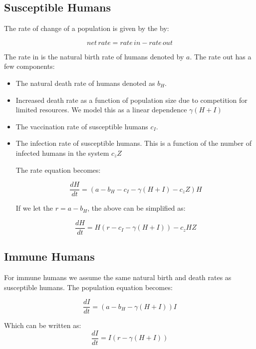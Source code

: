 \documentclass[
	12pt
]{article}
\begin{document}
\subsection{Susceptible Humans}


The rate of change of a population is given by the by:

\begin{equation}
net \, rate = rate \, in - rate \, out
\end{equation}

The rate in is the natural birth rate of humans denoted by $a$. The rate out has a few components:

\begin{itemize}
\item The natural death rate of humans denoted as $b_H$.
\item Increased death rate as a function of population size due to competition for limited resources. We model this as a linear dependence $\gamma(H+I)$
\item The vaccination rate of susceptible humans $c_I$.
\item The infection rate of susceptible humans. This is a function of the number of infected humans in the system $c_zZ$

The rate equation becomes:

\begin{equation}
\frac{dH}{dt} = (a-b_H-c_I-\gamma(H+I)-c_zZ)H
\end{equation}

If we let the $r = a-b_H$, the above can be simplified as:

\begin{equation}
\frac{dH}{dt} = H(r - c_I-\gamma(H+I))-c_zHZ
\end{equation}
\end{itemize}

\subsection{Immune Humans}

For immune humans we assume the same natural birth and death rates as susceptible humans. The population equation becomes:

\begin{equation}
\frac{dI}{dt} = (a-b_H-\gamma(H+I))I
\end{equation}

Which can be written as:
\begin{equation}
\frac{dI}{dt} = I(r-\gamma(H+I))
\end{equation}
\end{document}
